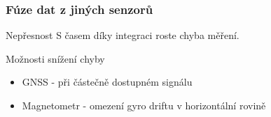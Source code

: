 \documentclass[%
  12pt,       				%
	t,                  %
	aspectratio=1610,   %
	unicode,						%
]{beamer}				    	%
\begin{document}
\begin{frame} 
	\frametitle{Fúze dat z jiných senzorů}
		\begin{alertblock}{Nepřesnost}
		S časem díky integraci roste chyba měření.
		\end{alertblock}
		\vspace{4ex}
		\begin{block}{Možnosti snížení chyby}
		\begin{itemize}
		\item GNSS - při částečně dostupném signálu
		\item Magnetometr - omezení gyro driftu v horizontální rovině
		\end{itemize}
		\end{block}

	
\end{frame} 
\end{document}

